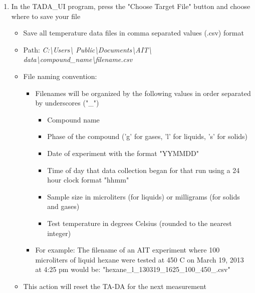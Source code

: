 \documentclass[letterpaper,11pt]{article}
\begin{document}
\begin{enumerate}
    \item In the TADA\_UI program, press the "Choose Target File" button and 
        choose where to save your file
        \begin{itemize}
        \item Save all temperature data files in comma separated values (.csv) 
            format
        \item Path: \textit{C:\textbackslash Users\textbackslash 
            Public\textbackslash Documents\textbackslash AIT\textbackslash 
            data\textbackslash compound\_name\textbackslash filename.csv}
        \item File naming convention: 
            \begin{itemize}
            \item Filenames will be organized by the following values in order 
                separated by underscores ("\_")
                    \begin{itemize}
                    \item Compound name
                    \item Phase of the compound ('g' for gases, 'l' for liquids,
                        's' for solids)
                    \item Date of experiment with the format "YYMMDD"
                    \item Time of day that data collection began for that run
                        using a 24 hour clock format "hhmm"
                    \item Sample size in microliters (for liquids) or milligrams
                        (for solids and gases)
                    \item Test temperature in degrees Celsius (rounded to the 
                        nearest integer)
                    \end{itemize}
                    
            \item For example: The filename of an AIT experiment where 100 
                microliters of liquid hexane were tested at 450 \degree C on 
                March 19, 2013 at 4:25 pm would be: \newline
                "hexane\_l\_130319\_1625\_100\_450\_.csv"
            \end{itemize}    
        \item This action will reset the TA-DA for the next measurement        
        \end{itemize}
    

\end{enumerate}
\end{document}
